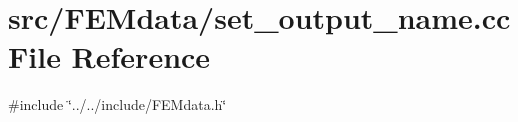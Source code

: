 \section{src/\+F\+E\+Mdata/set\+\_\+output\+\_\+name.cc File Reference}
\label{set__output__name_8cc}
{\ttfamily \#include \char`\"{}../../include/\+F\+E\+Mdata.\+h\char`\"{}}\newline
